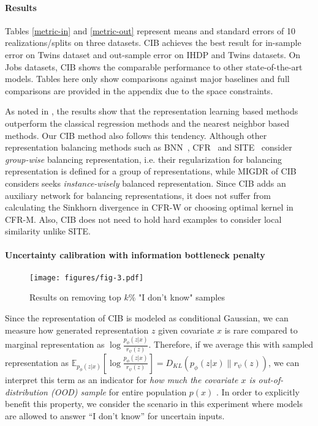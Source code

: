 \documentclass{article}
\begin{document}
    \paragraph{Results} Tables \ref{metric-in} and \ref{metric-out} represent means and standard errors of 10 realizations/splits on three datasets. CIB achieves the best result for in-sample error on Twins dataset and out-sample error on IHDP and Twins datasets. On Jobs datasets, CIB shows the comparable performance to other state-of-the-art models. Tables here only show comparisons against major baselines and full comparisons are provided in the appendix due to the space constraints. 
    
    As noted in \cite{yao2018}, the results show that the representation learning based methods outperform the classical regression methods and the nearest neighbor based methods. Our CIB method also follows this tendency. Although other representation balancing methods such as BNN~\cite{johansson16}, CFR~\cite{Shalit17} and SITE~\cite{yao2018} consider \emph{group-wise} balancing representation, i.e. their regularization for balancing representation is defined for a group of representations, while MIGDR of CIB considers seeks \emph{instance-wisely} balanced representation. Since CIB adds an auxiliary network for balancing representations, it does not suffer from calculating the Sinkhorn divergence in CFR-W or choosing optimal kernel in CFR-M. Also, CIB does not need to hold hard examples to consider local similarity unlike SITE.
        
    \vspace{-.1cm}
    \paragraph{Uncertainty calibration with information bottleneck penalty}
    
    \begin{wrapfigure}{r}{0.52\textwidth}
        \centering
        \vspace{-20pt}
        \texttt{[image: figures/fig-3.pdf]}
        \caption{Results on removing top $k\%$ "I don't know" samples }
        \vspace{-12pt}
 	\label{fig:unc-calib}
    \end{wrapfigure}

    Since the representation of CIB is modeled as conditional Gaussian, we can measure how generated representation $z$ given covariate $x$ is rare compared to marginal representation as $\log\frac{p_{\phi}(z|x)}{r_{\psi}(z)}$. Therefore, if we average this with sampled representation as $\mathbb{E}_{p_{\phi}(z|x)}[\log\frac{p_{\phi}(z|x)}{r_{\psi}(z)}]  {=} D_{KL}( p_{\phi}(z|x) \| r_{\psi}(z) )$, we can interpret this term as an indicator for \textit{how much the covariate $x$ is out-of-distribution (OOD) sample} for entire population $p(x)$ \cite{alemi2018}. In order to explicitly benefit this property, we consider the scenario in this experiment where models are allowed to answer ``I don't know'' for uncertain inputs. 
    
\end{document}
